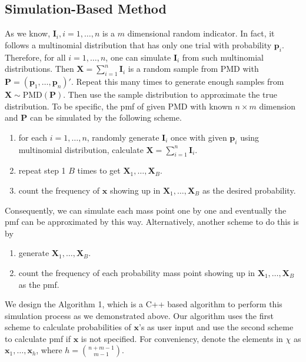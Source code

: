 \documentclass[12pt]{article}
\newcommand{\Ivec}{{\boldsymbol{I}}}
\newcommand{\Pmat}{\mathbf{P}}
\newcommand{\pvec}{\boldsymbol{p}}
\newcommand{\PMD}{\textrm{PMD}}
\newcommand{\Xvec}{\boldsymbol{X}}
\newcommand{\xvec}{\boldsymbol{x}}
\begin{document}
\subsection{Simulation-Based Method}
As we know, $\Ivec_i, i=1,\dots,n$ is a $m$ dimensional random indicator. In fact, it follows a multinomial distribution that has only one trial with probability $\pvec_i$. Therefore, for all $i=1,\dots, n$, one can simulate $\Ivec_i$ from such multinomial distributions. Then $\Xvec = \sum_{i=1}^{n}\Ivec_i$ is a random sample from $\PMD$ with $\Pmat = (\pvec_1, \dots,\pvec_n)'$. Repeat this many times to generate enough samples from $\Xvec \sim \PMD(\Pmat)$. Then use the sample distribution to approximate the true distribution. To be specific, the pmf of given $\PMD$ with known $n \times m$ dimension and $\Pmat$ can be simulated by the following scheme.

\begin{enumerate}[Step 1]
    \item for each $i=1,\dots,n$,  randomly generate $\Ivec_i$ once with given $\pvec_i$ using multinomial distribution, calculate $\Xvec = \sum_{i=1}^{n}\Ivec_i$.
    \item repeat step 1 $B$ times to get $\Xvec_{1},\dots,\Xvec_{B}.$
    \item count the frequency of $\xvec$ showing up in $\Xvec_{1},\dots,\Xvec_{B}$ as the desired probability.
\end{enumerate}
Consequently, we can simulate each mass point one by one and eventually the pmf can be approximated by this way. Alternatively, another scheme to do this is by
\begin{enumerate}[Step 1]
	\item generate $\Xvec_{1},\dots,\Xvec_{B}$.
	\item count the frequency of each probability mass point showing up in $\Xvec_{1},\dots,\Xvec_{B}$ as the pmf.
\end{enumerate}
 We design the Algorithm 1, which is a C++ based algorithm to perform this simulation process as we demonstrated above. Our algorithm uses the first scheme to calculate probabilities of $\xvec$'s as user input  and use the second scheme to calculate pmf if $\xvec$ is not specified. For conveniency, denote the elements in $\chi$ as $\xvec_1, \dots, \xvec_h$, where $h=\binom{n+m-1}{m-1}$.
\end{document}
